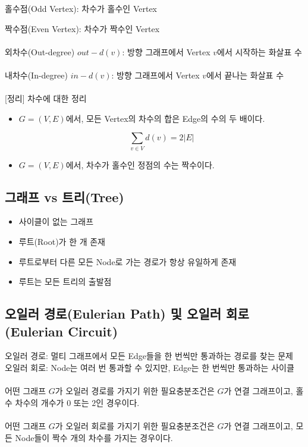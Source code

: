 홀수점(Odd Vertex): 차수가 홀수인 Vertex

짝수점(Even Vertex): 차수가 짝수인 Vertex
\\\\
외차수(Out-degree) $out-d(v)$: 방향 그래프에서 Vertex $v$에서 시작하는 화살표 수
\\\\
내차수(In-degree) $in-d(v)$: 방향 그래프에서 Vertex $v$에서 끝나는 화살표 수
\\\\\phantom{}
[정리] 차수에 대한 정리
\begin{itemize}
    \item $G = (V, E)$에서, 모든 Vertex의 차수의 합은 Edge의 수의 두 배이다.
    
    $$\sum_{v \in V} d(v) = 2|E|$$
    \item $G = (V, E)$에서, 차수가 홀수인 정점의 수는 짝수이다.
\end{itemize}

\newpage
\subsection{그래프 vs 트리(Tree)}
\begin{itemize}
    \item 사이클이 없는 그래프
    \item 루트(Root)가 한 개 존재
    \item 루트로부터 다른 모든 Node로 가는 경로가 항상 유일하게 존재
    \item 루트는 모든 트리의 출발점
\end{itemize}

\subsection{오일러 경로(Eulerian Path) 및 오일러 회로(Eulerian Circuit)}
오일러 경로: 멀티 그래프에서 모든 Edge들을 한 번씩만 통과하는 경로를 찾는 문제\\
오일러 회로: Node는 여러 번 통과할 수 있지만, Edge는 한 번씩만 통과하는 사이클\\\\
어떤 그래프 $G$가 오일러 경로를 가지기 위한 필요충분조건은 $G$가 연결 그래프이고, 홀수 차수의 개수가 $0$ 또는 $2$인 경우이다.\\\\
어떤 그래프 $G$가 오일러 회로를 가지기 위한 필요충분조건은 $G$가 연결 그래프이고, 모든 Node들이 짝수 개의 차수를 가지는 경우이다.

